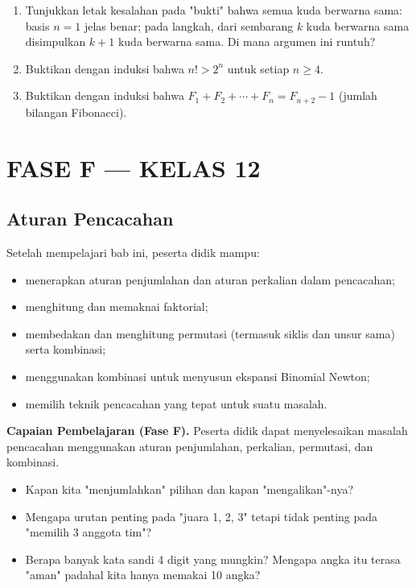 \documentclass[11pt,a4paper]{report}
\theoremstyle{gaya}
\begin{document}
\begin{challenge}
\begin{enumerate}[leftmargin=*,topsep=2pt]
  \item Tunjukkan letak kesalahan pada "bukti" bahwa semua kuda berwarna sama: basis $n=1$ jelas benar; pada langkah, dari sembarang $k$ kuda berwarna sama disimpulkan $k+1$ kuda berwarna sama. Di mana argumen ini runtuh?
  \item Buktikan dengan induksi bahwa $n!>2^n$ untuk setiap $n\ge4$.
  \item Buktikan dengan induksi bahwa $F_1+F_2+\cdots+F_n=F_{n+2}-1$ (jumlah bilangan Fibonacci).
\end{enumerate}
\end{challenge}

\part*{\centering FASE F --- KELAS 12}

\chapter{Aturan Pencacahan}
\begin{tujuan}
Setelah mempelajari bab ini, peserta didik mampu:
\begin{itemize}[leftmargin=*,topsep=2pt]
  \item menerapkan aturan penjumlahan dan aturan perkalian dalam pencacahan;
  \item menghitung dan memaknai faktorial;
  \item membedakan dan menghitung permutasi (termasuk siklis dan unsur sama) serta kombinasi;
  \item menggunakan kombinasi untuk menyusun ekspansi Binomial Newton;
  \item memilih teknik pencacahan yang tepat untuk suatu masalah.
\end{itemize}
\textbf{Capaian Pembelajaran (Fase F).} Peserta didik dapat menyelesaikan masalah pencacahan menggunakan aturan penjumlahan, perkalian, permutasi, dan kombinasi.
\end{tujuan}

\begin{pemantik}
\begin{itemize}[leftmargin=*,topsep=2pt]
  \item Kapan kita "menjumlahkan" pilihan dan kapan "mengalikan"-nya?
  \item Mengapa urutan penting pada "juara 1, 2, 3" tetapi tidak penting pada "memilih 3 anggota tim"?
  \item Berapa banyak kata sandi 4 digit yang mungkin? Mengapa angka itu terasa "aman" padahal kita hanya memakai 10 angka?
\end{itemize}
\end{pemantik}
\end{document}
